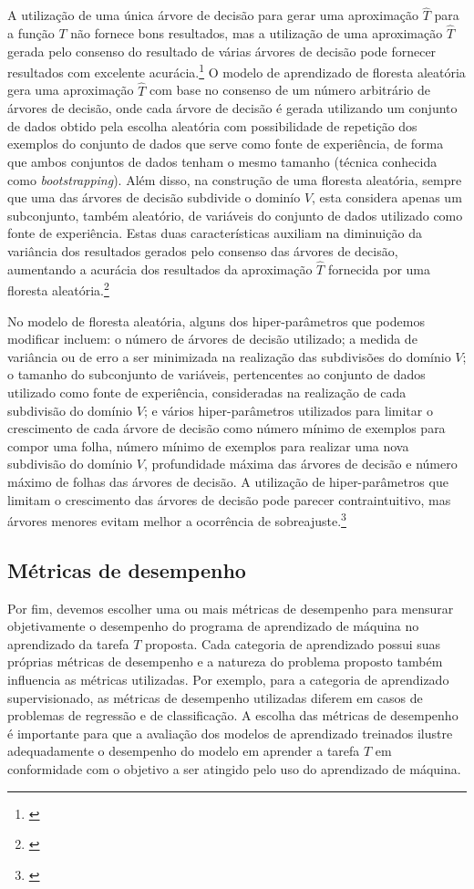 A utilização de uma única árvore de decisão para gerar uma aproximação $\hat{T}$ para a função $T$ não fornece bons resultados, mas a utilização de uma aproximação $\hat{T}$ gerada pelo consenso do resultado de várias árvores de decisão pode fornecer resultados com excelente acurácia.\footnote{\cite[p.303]{statistical_learning}} O modelo de aprendizado de floresta aleatória gera uma aproximação $\hat{T}$ com base no consenso de um número arbitrário de árvores de decisão, onde cada árvore de decisão é gerada utilizando um conjunto de dados obtido pela escolha aleatória com possibilidade de repetição dos exemplos do conjunto de dados que serve como fonte de experiência, de forma que ambos conjuntos de dados tenham o mesmo tamanho (técnica conhecida como \textit{bootstrapping}). Além disso, na construção de uma floresta aleatória, sempre que uma das árvores de decisão subdivide o dominío $V$, esta considera apenas um subconjunto, também aleatório, de variáveis do conjunto de dados utilizado como fonte de experiência. Estas duas características auxiliam na diminuição da variância dos resultados gerados pelo consenso das árvores de decisão, aumentando a acurácia dos resultados da aproximação $\hat{T}$ fornecida por uma floresta aleatória.\footnote{\cite[p.316-321]{statistical_learning}}

No modelo de floresta aleatória, alguns dos hiper-parâmetros que podemos modificar incluem: o número de árvores de decisão utilizado; a medida de variância ou de erro a ser minimizada na realização das subdivisões do domínio $V$; o tamanho do subconjunto de variáveis, pertencentes ao conjunto de dados utilizado como fonte de experiência, consideradas na realização de cada subdivisão do domínio $V$; e vários hiper-parâmetros utilizados para limitar o crescimento de cada árvore de decisão como número mínimo de exemplos para compor uma folha, número mínimo de exemplos para realizar uma nova subdivisão do domínio $V$, profundidade máxima das árvores de decisão e número máximo de folhas das árvores de decisão. A utilização de hiper-parâmetros que limitam o crescimento das árvores de decisão pode parecer contraintuitivo, mas árvores menores evitam melhor a ocorrência de sobreajuste.\footnote{\cite[p.307]{statistical_learning}}

\subsection{Métricas de desempenho}

Por fim, devemos escolher uma ou mais métricas de desempenho para mensurar objetivamente o desempenho do programa de aprendizado de máquina no aprendizado da tarefa $T$ proposta. Cada categoria de aprendizado possui suas próprias métricas de desempenho e a natureza do problema proposto também influencia as métricas utilizadas. Por exemplo, para a categoria de aprendizado supervisionado, as métricas de desempenho utilizadas diferem em casos de problemas de regressão e de classificação. A escolha das métricas de desempenho é importante para que a avaliação dos modelos de aprendizado treinados ilustre adequadamente o desempenho do modelo em aprender a tarefa $T$ em conformidade com o objetivo a ser atingido pelo uso do aprendizado de máquina.

